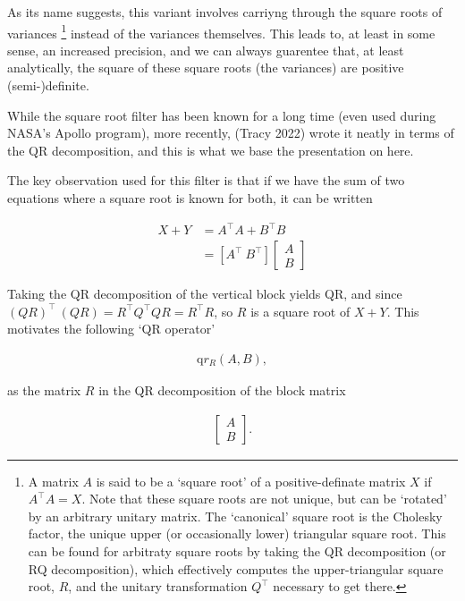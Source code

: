 \documentclass[
]{report}
\theoremstyle{plain}
\theoremstyle{plain}
\theoremstyle{remark}
\begin{document}
As its name suggests, this variant involves carriyng through the square
roots of variances \footnote{A matrix \(A\) is said to be a `square
  root' of a positive-definate matrix \(X\) if \(A^\intercal A = X\).
  Note that these square roots are not unique, but can be `rotated' by
  an arbitrary unitary matrix. The `canonical' square root is the
  Cholesky factor, the unique upper (or occasionally lower) triangular
  square root. This can be found for arbitraty square roots by taking
  the QR decomposition (or RQ decomposition), which effectively computes
  the upper-triangular square root, \(R\), and the unitary
  transformation \(Q^\intercal\) necessary to get there.} instead of the
variances themselves. This leads to, at least in some sense, an
increased precision, and we can always guarentee that, at least
analytically, the square of these square roots (the variances) are
positive (semi-)definite.

While the square root filter has been known for a long time (even used
during NASA's Apollo program), more recently, (Tracy 2022) wrote it
neatly in terms of the QR decomposition, and this is what we base the
presentation on here.

The key observation used for this filter is that if we have the sum of
two equations where a square root is known for both, it can be written

\[\begin{split}
  X + Y &= A^\intercal A + B^\intercal B\\
  &= \left[A^\intercal\ B^\intercal\right] \left[\begin{matrix}A\\B\end{matrix}\right]
\end{split}
\]

Taking the QR decomposition of the vertical block yields QR, and since
\((QR)^\intercal\ (QR) = R^\intercal Q^\intercal Q R = R^\intercal R\),
so \(R\) is a square root of \(X+Y\). This motivates the following `QR
operator'

\[\begin{split}
\mathrm qr_R(A, B),
\end{split}
\]

as the matrix \(R\) in the QR decomposition of the block matrix

\[\begin{split}
\left[\begin{matrix}A\\B\end{matrix}\right].
\end{split}
\]
\end{document}
